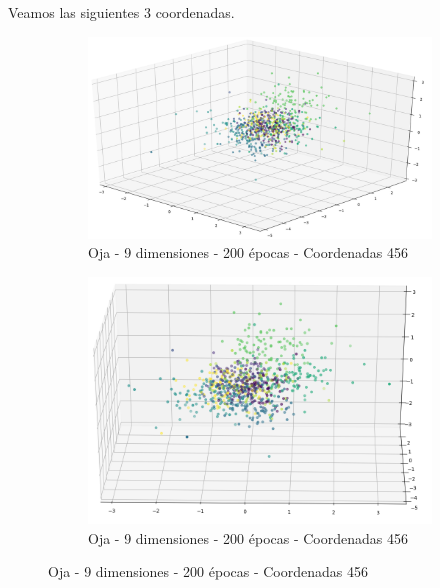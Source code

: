 Veamos las siguientes 3 coordenadas.

\begin{figure}[!htbp]
\centering
\begin{subfigure}{.5\textwidth}
  \centering
  \includegraphics[width=1\linewidth, scale=1]{../img/ej1/oja_corrida_200_9/oja_9salida_200ep_testing_dim456.png}
  \caption{Oja - 9 dimensiones - 200 épocas - Coordenadas 456}
  \label{fig:sub1}
\end{subfigure}%
\begin{subfigure}{.5\textwidth}
  \centering
  \includegraphics[width=1\linewidth, scale=1]{../img/ej1/oja_corrida_200_9/oja_9salida_200ep_testing_dim456_2.png}
  \caption{Oja - 9 dimensiones - 200 épocas - Coordenadas 456}
  \label{fig:sub2}
\end{subfigure}
\end{figure}

